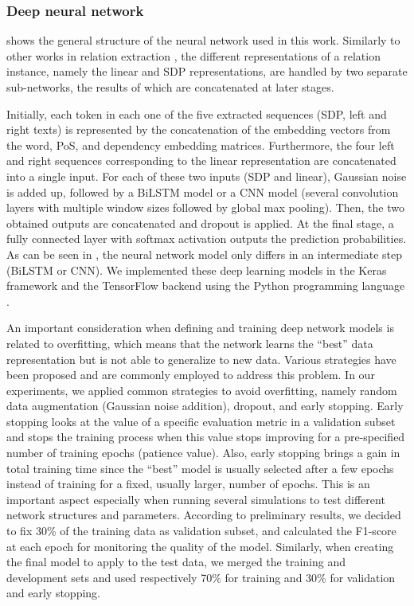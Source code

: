 \subsubsection{Deep neural network}

 shows the general structure of the neural network used in this work.
Similarly to other works in relation extraction \parencite{zhang2017a,peng2018a,mehryary2018a}, the different representations of a relation instance, namely the linear and SDP representations, are handled by two separate sub-networks, the results of which are concatenated at later stages.

Initially, each token in each one of the five extracted sequences (SDP, left and right texts) is represented by the concatenation of the embedding vectors from the word, PoS, and dependency embedding matrices.
Furthermore, the four left and right sequences corresponding to the linear representation are concatenated into a single input.
For each of these two inputs (SDP and linear), Gaussian noise is added up, followed by a BiLSTM model or a CNN model (several convolution layers with multiple window sizes followed by global max pooling).
Then, the two obtained outputs are concatenated and dropout is applied.
At the final stage, a fully connected layer with softmax activation outputs the prediction probabilities.
As can be seen in , the neural network model only differs in an intermediate step (BiLSTM or CNN).
We implemented these deep learning models in the Keras framework \parencite{chollet2015a} and the TensorFlow backend \parencite{abadi2016a} using the Python programming language \parencite{chollet2017a}.



An important consideration when defining and training deep network models is related to overfitting, which means that the network learns the ``best'' data representation but is not able to generalize to new data.
Various strategies have been proposed and are commonly employed to address this problem.
In our experiments, we applied common strategies to avoid overfitting, namely random data augmentation (Gaussian noise addition), dropout, and early stopping.
Early stopping looks at the value of a specific evaluation metric in a validation subset and stops the training process when this value stops improving for a pre-specified number of training epochs (patience value).
Also, early stopping brings a gain in total training time since the ``best'' model is usually selected after a few epochs instead of training for a fixed, usually larger, number of epochs.
This is an important aspect especially when running several simulations to test different network structures and parameters.
According to preliminary results, we decided to fix 30\% of the training data as validation subset, and calculated the F1-score at each epoch for monitoring the quality of the model.
Similarly, when creating the final model to apply to the test data, we merged the training and development sets and used respectively 70\% for training and 30\% for validation and early stopping.

